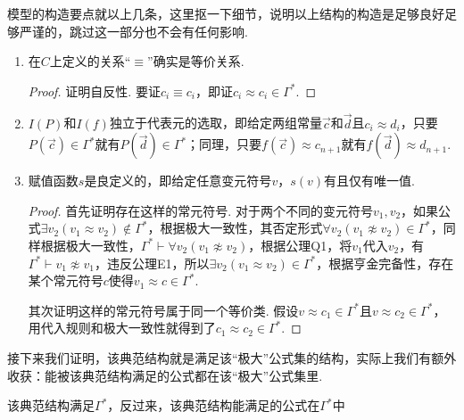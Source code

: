 模型的构造要点就以上几条，这里抠一下细节，说明以上结构的构造是足够良好足够严谨的，跳过这一部分也不会有任何影响.
\begin{enumerate}
    \item 在$C$上定义的关系“$\equiv$”确实是等价关系.
    \begin{proof}
        证明自反性. 要证$c_i \equiv c_i$，即证$c_i \approx c_i \in \Gamma^*$. 
    \end{proof}

    \item $I(P)$和$I(f)$独立于代表元的选取，即给定两组常量$\vec c$和$\vec d$且$c_i \approx d_i$，只要$P(\vec c) \in \Gamma^*$就有$P(\vec d) \in \Gamma^*$；同理，只要$f(\vec c)\approx c_{n+1}$就有$f(\vec d) \approx d_{n+1}$.
    
    \item 赋值函数$s$是良定义的，即给定任意变元符号$v$，$s(v)$有且仅有唯一值.
    \begin{proof}
        首先证明存在这样的常元符号. 对于两个不同的变元符号$v_1,v_2$，如果公式$\exists v_2 (v_1 \approx v_2) \not \in \Gamma^*$，根据极大一致性，其否定形式$\forall v_2 (v_1 \not\approx v_2) \in \Gamma^*$，同样根据极大一致性，$\Gamma^* \vdash \forall v_2 (v_1 \not\approx v_2)$，根据公理Q1，将$v_1$代入$v_2$，有$\Gamma^* \vdash v_1 \not\approx v_1$，违反公理E1，所以$\exists v_2 (v_1 \approx v_2) \in \Gamma^*$，根据亨金完备性，存在某个常元符号$c$使得$v_1 \approx c \in \Gamma^*$. 

        其次证明这样的常元符号属于同一个等价类. 假设$v \approx c_1 \in \Gamma^*$且$v \approx c_2 \in \Gamma^*$，用代入规则和极大一致性就得到了$c_1 \approx c_2 \in \Gamma^*$.
    \end{proof}

\end{enumerate}

接下来我们证明，该典范结构就是满足该“极大”公式集的结构，实际上我们有额外收获：能被该典范结构满足的公式都在该“极大”公式集里.

\begin{lemma}{}
    该典范结构满足$\Gamma^*$，反过来，该典范结构能满足的公式在$\Gamma^*$中
\end{lemma}

